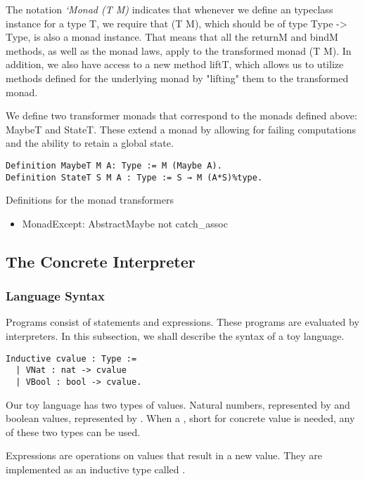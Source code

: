 The notation \textit{`Monad (T M)} indicates that whenever we define an
typeclass instance for a type T, we require that (T M), which should be of type
Type -> Type, is also a monad instance. That means that all the returnM and
bindM methods, as well as the monad laws, apply to the transformed monad (T M).
In addition, we also have access to a new method liftT, which allows us to
utilize methods defined for the underlying monad by "lifting" them to the
transformed monad. 

We define two transformer monads that correspond to the monads defined above:
MaybeT and StateT. These extend a monad by allowing for failing computations
and the ability to retain a global state. 

\begin{listing}
\begin{verbatim}
Definition MaybeT M A: Type := M (Maybe A).
Definition StateT S M A : Type := S → M (A*S)%type.
\end{verbatim}
\caption{Definitions for the monad transformers}
\end{listing}

\begin{itemize}
    \item {MonadExcept: AbstractMaybe not catch\_assoc}
\end{itemize}

\subsection{The Concrete Interpreter}

\subsubsection{Language Syntax}\label{sec:lang}
Programs consist of statements and expressions. These programs are evaluated by
interpreters. In this subsection, we shall describe the syntax of a toy
language.


\begin{verbatim}
Inductive cvalue : Type :=
  | VNat : nat -> cvalue
  | VBool : bool -> cvalue.
\end{verbatim}

Our toy language has two types of values. Natural numbers, represented by
 and boolean values, represented by . 
When a , short for concrete value is needed, any of these two 
types can be used.

Expressions are operations on values that result in a new value. They are
implemented as an inductive type called . 

